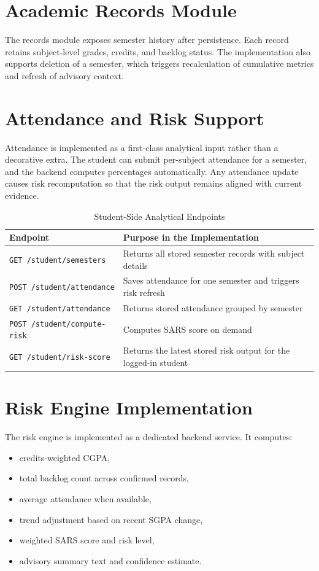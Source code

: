 \section{Academic Records Module}
The records module exposes semester history after persistence. Each record retains subject-level grades, credits, and backlog status. The implementation also supports deletion of a semester, which triggers recalculation of cumulative metrics and refresh of advisory context.

\section{Attendance and Risk Support}
Attendance is implemented as a first-class analytical input rather than a decorative extra. The student can submit per-subject attendance for a semester, and the backend computes percentages automatically. Any attendance update causes risk recomputation so that the risk output remains aligned with current evidence.

\begin{table}[H]
\centering
\caption{Student-Side Analytical Endpoints}
\begin{tabularx}{\textwidth}{>{\raggedright\arraybackslash}p{} >{\raggedright\arraybackslash}X}
\toprule
\textbf{Endpoint} & \textbf{Purpose in the Implementation} \\
\midrule
\texttt{GET /student/semesters} & Returns all stored semester records with subject details \\
\texttt{POST /student/attendance} & Saves attendance for one semester and triggers risk refresh \\
\texttt{GET /student/attendance} & Returns stored attendance grouped by semester \\
\texttt{POST /student/compute-risk} & Computes SARS score on demand \\
\texttt{GET /student/risk-score} & Returns the latest stored risk output for the logged-in student \\
\bottomrule
\end{tabularx}
\end{table}

\section{Risk Engine Implementation}
The risk engine is implemented as a dedicated backend service. It computes:
\begin{itemize}[leftmargin=*]
\item credits-weighted CGPA,
\item total backlog count across confirmed records,
\item average attendance when available,
\item trend adjustment based on recent SGPA change,
\item weighted SARS score and risk level,
\item advisory summary text and confidence estimate.
\end{itemize}

